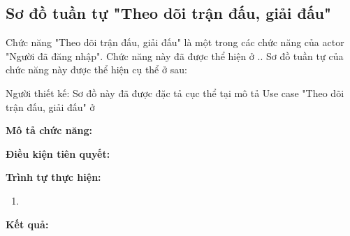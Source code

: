 \subsection{Sơ đồ tuần tự "Theo dõi trận đấu, giải đấu"}
\setcounter{figure}{0}

Chức năng "Theo dõi trận đấu, giải đấu" là một trong các chức năng của actor
"Người đã đăng nhập". Chức năng này đã được thể hiện ở ..
Sơ đồ tuần tự của chức năng này được thể hiện cụ thể ở \myref{} sau:

Người thiết kế:
Sơ đồ này đã được đặc tả cục thể tại mô tả Use case "Theo dõi trận đấu, giải đấu"
ở 

\noindent
\textbf{Mô tả chức năng:}

\noindent
\textbf{Điều kiện tiên quyết:}

\noindent
\textbf{Trình tự thực hiện:}

\noindent
\begin{enumerate}
  \item
\end{enumerate}

\noindent
\textbf{Kết quả:}

